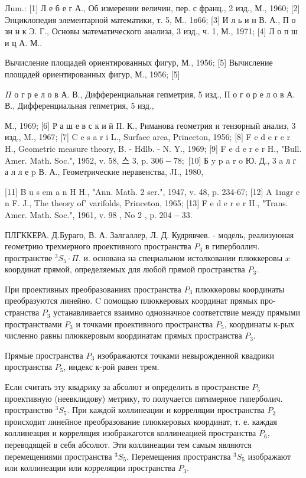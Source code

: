 \documentclass[10pt]{article}
\begin{document}
Лum.: [1] Л е б е г А., Об измерении величин, пер. с франц., 2 изд., М., 1960; [2] Энциклопедия элементарной математики, т. 5, М.. 1ө66; [3] И л ь и н В. А., П о зн н к Э. Г., Основы математического анализа, 3 изд., ч. 1, М., 1971; [4] Л о п ш и ц А. М..

Вычисление площадей ориентированных фигур, М., 1956; [5] Вычисление площадей ориентированных фигур, М., 1956; [5]

$\Pi$ о г р е л о в А. В., Дифференциальная гепметрия, 5 изд., П о г о р е л о в А. В., Дифференциальная гепметрия, 5 изд.,

М., 1969; [6] Р а ш е в с к и й П. К., Риманова геометрия и тензорный анализ, 3 изд., M., 1967; [7] C e s a r i L., Surface area, Princeton, 1956; [8] F e d e r e r H., Geometric measure theory, B. - Hdlb. - N. Y., 1969; [9] F e d e r e r H., "Bull. Amer. Math. Soc.", 1952, v. 58, 스 3, p. $306-78 ;$ [10] Б y p a r o Ю. Д., 3 a л г а л л е p В. А., Геометрические неравенства, JI., 1980,

[11] B u s em a n $\mathrm{H}$ Н., "Ann. Math. 2 ser.", 1947, v. 48, p. 234-67; [12] A $1 \mathrm{mg} \mathrm{r}$ e $\mathrm{n}$ F. J., The theory of' varifolds, Princeton, 1965; [13] F e d e r e r H., "Trans. Amer. Math. Soc.", 1961, v. 98 , No 2 , p. $204-33$.



ПЛГККЕРА. Д.Бураго, В. А. Залгаллер, Л. Д. Кудрявчев. - модель, реализуюная геометрию трехмерного проективного пространства $P_{3}$ в гиперболлич. пространстве ${ }^{3} S_{5} \cdot \Pi$. и. основана на специальном истолковании плюккеровы $x$ координат прямой, определяемых для любой прямой пространства $P_{3}$.



При проективных преобразованиях пространства $P_{3}$ плюккөровы координаты преобразуются линейно. C помощью плюккеровых координат прямых про- странства $P_{3}$ устанавливается взаимно однозначное соответствие между прямыми пространствами $P_{3}$ и точками проективного пространства $P_{5}$, координаты к-рых численно равны плюккеровым координатам прямых пространства $P_{3}$.



Прямые пространства $P_{3}$ изображаются точками невырожденной квадрики пространства $P_{5}$, индекс к-рой равен трем.



Если считать эту квадрику за абсолют и определить в пространстве $P_{5}$ проективную (неевклидову) метрику, то получается пятимерное гиперболич. пространство ${ }^{3} S_{5}$. При каждой коллинеации и корреляции пространства $P_{3}$ происходит линейное преобразование плюккеровых координат, т. е. каждая коллинеация и корреляция изображаготся коллинеацией пространства $P_{6}$, переводящей в себя абсолют. Эти коллинеации тем самым являются перемещениями пространства ${ }^{3} S_{5}$. Перемещения пространства ${ }^{3} S_{5}$ изображают или коллинеации или корреляции пространства $P_{3}$.
\end{document}
